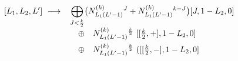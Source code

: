 \begin{equation}\label{mmDAflowIV}
[L_{1},L_{2},L'] \ \longrightarrow \ \makebox[8cm][l]{$\displaystyle\begin{array}[t]{l}\displaystyle \bigoplus_{J< \frac{k}{2}}
\bigl( N^{(k)}_{L_{1} (L'-1)}{}^{J}+N^{(k)}_{L_{1} (L'-1)}{}^{k-J} \bigr) [J,1-L_{2},0]\\
 \quad \oplus \quad N^{(k)}_{L_{1} (L'-1)}{}^{\frac{k}{2}} \ [[\frac{k}{2},+],1-L_{2},0] \\[2mm]
 \quad \oplus \quad N^{(k)}_{L_{1} (L'-1)}{}^{\frac{k}{2}} \ ([[\frac{k}{2},-],1-L_{2},0]
\end{array}$ }
\end{equation}

